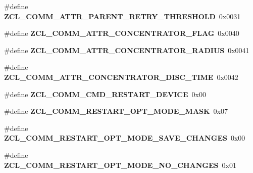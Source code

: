 \begin{DoxyCompactItemize}
\item 
\hypertarget{group__zcl__commissioning_gad7e7b7d1a9f1102424c4a82679d48f77}{\#define {\bfseries Z\-C\-L\-\_\-\-C\-O\-M\-M\-\_\-\-A\-T\-T\-R\-\_\-\-P\-A\-R\-E\-N\-T\-\_\-\-R\-E\-T\-R\-Y\-\_\-\-T\-H\-R\-E\-S\-H\-O\-L\-D}~0x0031}\label{group__zcl__commissioning_gad7e7b7d1a9f1102424c4a82679d48f77}

\item 
\hypertarget{group__zcl__commissioning_ga3d1ceb746a83fbc926d1c2a64719118f}{\#define {\bfseries Z\-C\-L\-\_\-\-C\-O\-M\-M\-\_\-\-A\-T\-T\-R\-\_\-\-C\-O\-N\-C\-E\-N\-T\-R\-A\-T\-O\-R\-\_\-\-F\-L\-A\-G}~0x0040}\label{group__zcl__commissioning_ga3d1ceb746a83fbc926d1c2a64719118f}

\item 
\hypertarget{group__zcl__commissioning_ga081f4edeaf02e6acb2054e8159189583}{\#define {\bfseries Z\-C\-L\-\_\-\-C\-O\-M\-M\-\_\-\-A\-T\-T\-R\-\_\-\-C\-O\-N\-C\-E\-N\-T\-R\-A\-T\-O\-R\-\_\-\-R\-A\-D\-I\-U\-S}~0x0041}\label{group__zcl__commissioning_ga081f4edeaf02e6acb2054e8159189583}

\item 
\hypertarget{group__zcl__commissioning_ga9501301017651a7119ed616c272c7b15}{\#define {\bfseries Z\-C\-L\-\_\-\-C\-O\-M\-M\-\_\-\-A\-T\-T\-R\-\_\-\-C\-O\-N\-C\-E\-N\-T\-R\-A\-T\-O\-R\-\_\-\-D\-I\-S\-C\-\_\-\-T\-I\-M\-E}~0x0042}\label{group__zcl__commissioning_ga9501301017651a7119ed616c272c7b15}

\item 
\hypertarget{group__zcl__commissioning_ga89b4de1f951e6ed93f14a4eddc5ecc01}{\#define {\bfseries Z\-C\-L\-\_\-\-C\-O\-M\-M\-\_\-\-C\-M\-D\-\_\-\-R\-E\-S\-T\-A\-R\-T\-\_\-\-D\-E\-V\-I\-C\-E}~0x00}\label{group__zcl__commissioning_ga89b4de1f951e6ed93f14a4eddc5ecc01}

\item 
\hypertarget{group__zcl__commissioning_ga3ee979d4f3b6acea58c3c89a04aae67f}{\#define {\bfseries Z\-C\-L\-\_\-\-C\-O\-M\-M\-\_\-\-R\-E\-S\-T\-A\-R\-T\-\_\-\-O\-P\-T\-\_\-\-M\-O\-D\-E\-\_\-\-M\-A\-S\-K}~0x07}\label{group__zcl__commissioning_ga3ee979d4f3b6acea58c3c89a04aae67f}

\item 
\hypertarget{group__zcl__commissioning_ga49df6eb7433e8acc414f4b945fbc68e0}{\#define {\bfseries Z\-C\-L\-\_\-\-C\-O\-M\-M\-\_\-\-R\-E\-S\-T\-A\-R\-T\-\_\-\-O\-P\-T\-\_\-\-M\-O\-D\-E\-\_\-\-S\-A\-V\-E\-\_\-\-C\-H\-A\-N\-G\-E\-S}~0x00}\label{group__zcl__commissioning_ga49df6eb7433e8acc414f4b945fbc68e0}

\item 
\hypertarget{group__zcl__commissioning_ga2243f4b499f9e3aeaa02d370a1e2e01c}{\#define {\bfseries Z\-C\-L\-\_\-\-C\-O\-M\-M\-\_\-\-R\-E\-S\-T\-A\-R\-T\-\_\-\-O\-P\-T\-\_\-\-M\-O\-D\-E\-\_\-\-N\-O\-\_\-\-C\-H\-A\-N\-G\-E\-S}~0x01}\label{group__zcl__commissioning_ga2243f4b499f9e3aeaa02d370a1e2e01c}


\end{DoxyCompactItemize}
